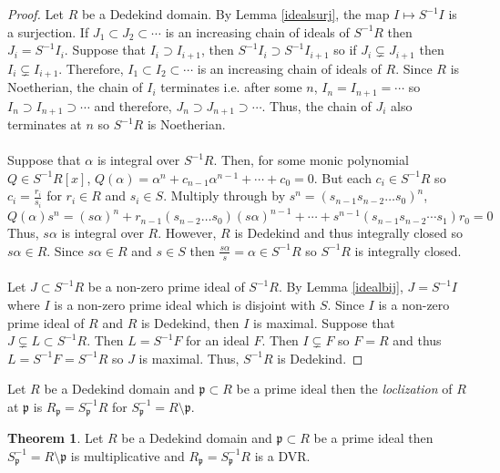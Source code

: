\documentclass[12pt]{extarticle}
\newcommand{\sm}{\! \setminus \!}
\theoremstyle{definition}
\newtheorem{theorem}{Theorem}[section]
\newenvironment{definition}[1][Definition:]{\begin{trivlist}
\item[\hskip \labelsep {\bfseries #1}]}{\end{trivlist}}
\begin{document}
\begin{proof}
Let $R$ be a Dedekind domain. By Lemma \ref{idealsurj}, the map $I \mapsto S^{-1} I$ is a surjection. If $J_1 \subset J_2 \subset \cdots $ is an increasing chain of ideals of $S^{-1}R$ then $J_i = S^{-1}I_i$. Suppose that $I_i \supset I_{i+1}$, then $S^{-1} I_i \supset S^{-1}I_{i+1}$ so if $J_i \subsetneq J_{i+1}$ then $I_i \subsetneq I_{i+1}$. Therefore, $I_1 \subset I_2 \subset \cdots$ is an increasing chain of ideals of $R$. Since $R$ is Noetherian, the chain of $I_i$ terminates i.e. after some $n$, $I_n = I_{n+1} = \cdots$ so $I_n \supset I_{n+1} \supset \cdots$ and therefore, $J_n \supset J_{n+1} \supset \cdots$. Thus, the chain of $J_i$ also terminates at $n$ so $S^{-1} R$ is Noetherian. 
\\ \\
Suppose that $\alpha$ is integral over $S^{-1}R$. Then, for some monic polynomial $Q \in S^{-1}R[x]$, $Q(\alpha) = \alpha^n + c_{n-1} \alpha^{n-1} + \cdots + c_0 = 0$. But each $c_i \in S^{-1}R$ so $c_i = \frac{r_i}{s_i}$ for $r_i \in R$ and $s_i \in S$. Multiply through by $s^n = (s_{n-1} s_{n-2} \dots s_0)^n$, \[Q(\alpha)s^n = (s \alpha)^n + r_{n-1} (s_{n-2} \dots s_0)(s \alpha)^{n-1} + \cdots + s^{n-1}( s_{n-1} s_{n-2} \cdots s_1) r_0 = 0\]
Thus, $s\alpha$ is integral over $R$. However, $R$ is Dedekind and thus integrally closed so $s \alpha \in R$. Since $s \alpha \in R$ and $s \in S$ then $\frac{s \alpha}{s} = \alpha \in S^{-1}R$ so $S^{-1}R$ is integrally closed. 
\\ \\
Let $J \subset S^{-1} R$ be a non-zero prime ideal of $S^{-1}R$. By Lemma \ref{idealbij}, $J = S^{-1}I$ where $I$ is a non-zero prime ideal which is disjoint with $S$. Since $I$ is a non-zero prime ideal of $R$ and $R$ is Dedekind, then $I$ is maximal. Suppose that $J \subsetneq L \subset S^{-1}R$. Then $L = S^{-1} F$ for an ideal $F$. Then $I \subsetneq F$ so $F = R$ and thus $L = S^{-1}F = S^{-1}R$ so $J$ is maximal. Thus, $S^{-1}R$ is Dedekind.
\end{proof}

\begin{definition}
Let $R$ be a Dedekind domain and $\mathfrak{p} \subset R$ be a prime ideal then the \textit{loclization} of $R$ at $\mathfrak{p}$ is $R_{\mathfrak{p}} = S_\mathfrak{p}^{-1}R$ for $S_\mathfrak{p}^{-1} = R \sm \mathfrak{p}$.
\end{definition}

\begin{theorem}
Let $R$ be a Dedekind domain and $\mathfrak{p} \subset R$ be a prime ideal then $S_\mathfrak{p}^{-1} = R \sm \mathfrak{p}$ is multiplicative and $R_{\mathfrak{p}} = S_\mathfrak{p}^{-1}R$ is a DVR. 
\end{theorem}
\end{document}
